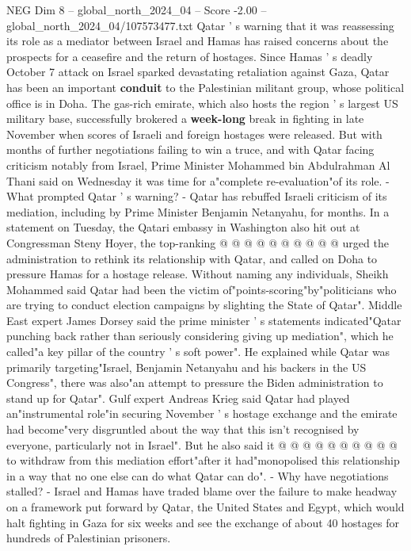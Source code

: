 \begin{textsample}{NEG Dim 8 – global\_north\_2024\_04 – Score -2.00 – global\_north\_2024\_04/107573477.txt}  \label{ex:f8_neg_130}
Qatar ' s warning that it was reassessing its role as a mediator between Israel and Hamas has raised concerns about the prospects for a ceasefire and the return of hostages.
Since Hamas ' s deadly October 7 attack on Israel sparked devastating retaliation against Gaza, Qatar has been an important \textbf{conduit} to the Palestinian militant group, whose political office is in Doha.
The gas-rich emirate, which also hosts the region ' s largest US military base, successfully brokered a \textbf{week-long} break in fighting in late November when scores of Israeli and foreign hostages were released.
But with months of further negotiations failing to win a truce, and with Qatar facing criticism notably from Israel, Prime Minister Mohammed bin Abdulrahman Al Thani said on Wednesday it was time for a"complete re-evaluation"of its role. - What prompted Qatar ' s warning? - Qatar has rebuffed Israeli criticism of its mediation, including by Prime Minister Benjamin Netanyahu, for months.
In a statement on Tuesday, the Qatari embassy in Washington also hit out at Congressman Steny Hoyer, the top-ranking @ @ @ @ @ @ @ @ @ @ urged the administration to rethink its relationship with Qatar, and called on Doha to pressure Hamas for a hostage release.
Without naming any individuals, Sheikh Mohammed said Qatar had been the victim of"points-scoring"by"politicians who are trying to conduct election campaigns by slighting the State of Qatar".
Middle East expert James Dorsey said the prime minister ' s statements indicated"Qatar punching back rather than seriously considering giving up mediation", which he called"a key pillar of the country ' s soft power".
He explained while Qatar was primarily targeting"Israel, Benjamin Netanyahu and his backers in the US Congress", there was also"an attempt to pressure the Biden administration to stand up for Qatar".
Gulf expert Andreas Krieg said Qatar had played an"instrumental role"in securing November ' s hostage exchange and the emirate had become"very disgruntled about the way that this isn't recognised by everyone, particularly not in Israel".
But he also said it @ @ @ @ @ @ @ @ @ @ to withdraw from this mediation effort"after it had"monopolised this relationship in a way that no one else can do what Qatar can do". - Why have negotiations stalled? - Israel and Hamas have traded blame over the failure to make headway on a framework put forward by Qatar, the United States and Egypt, which would halt fighting in Gaza for six weeks and see the exchange of about 40 hostages for hundreds of Palestinian prisoners.

\end{textsample}
